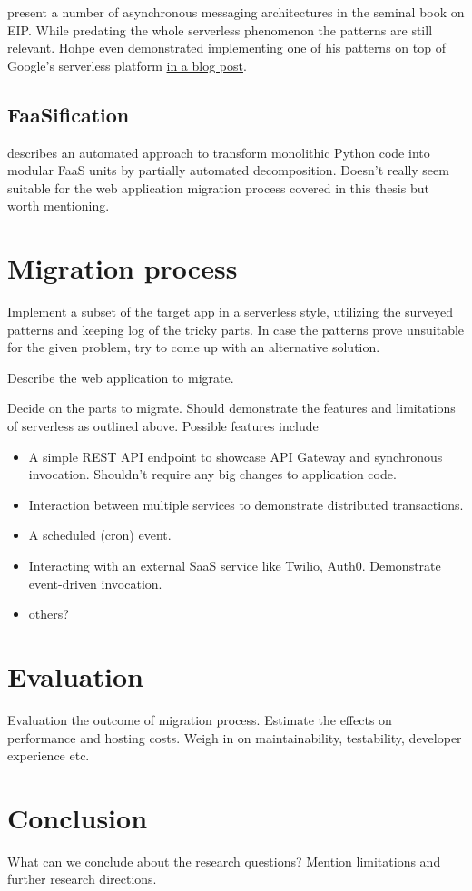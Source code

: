 \documentclass[utf8,english]{gradu3}
\begin{document}
\textcite{hohpe2004enterprise} present a number of asynchronous messaging architectures in the seminal book on EIP. While predating the whole serverless phenomenon the patterns are still relevant. Hohpe even demonstrated implementing one of his patterns on top of Google's serverless platform \href{http://www.enterpriseintegrationpatterns.com/ramblings/google_cloud_functions.html}{in a blog post}.

\section{FaaSification}

\textcite{spillner17transformpython} describes an automated approach to transform monolithic Python code into modular FaaS units by partially automated decomposition. Doesn't really seem suitable for the web application migration process covered in this thesis but worth mentioning.

\chapter{Migration process}

Implement a subset of the target app in a serverless style, utilizing the surveyed patterns and keeping log of the tricky parts. In case the patterns prove unsuitable for the given problem, try to come up with an alternative solution.

Describe the web application to migrate.

Decide on the parts to migrate. Should demonstrate the features and limitations of serverless as outlined above. Possible features include
\begin{itemize}
  \item A simple REST API endpoint to showcase API Gateway and synchronous invocation. Shouldn't require any big changes to application code.
  \item Interaction between multiple services to demonstrate distributed transactions.
  \item A scheduled (cron) event.
  \item Interacting with an external SaaS service like Twilio, Auth0. Demonstrate event-driven invocation.
  \item others?
\end{itemize}

\chapter{Evaluation}

Evaluation the outcome of migration process. Estimate the effects on performance and hosting costs. Weigh in on maintainability, testability, developer experience etc.

\chapter{Conclusion}

What can we conclude about the research questions? Mention limitations and further research directions.

\printbibliography
\end{document}
